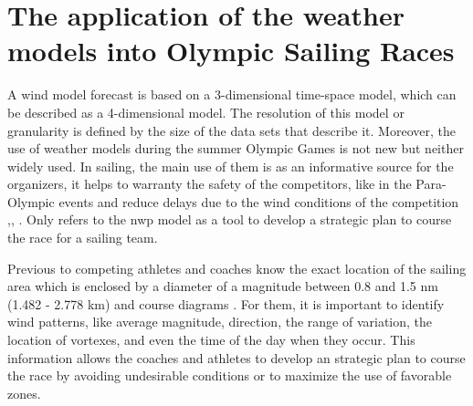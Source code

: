 



\section{The application of the weather models into Olympic Sailing Races}

A wind model forecast is based on a 3-dimensional time-space model, which can be described as a 4-dimensional model. The resolution of this model or granularity is defined by the size of the data sets that describe it. Moreover, the use of weather models during the summer Olympic Games is not new but neither widely used. In sailing, the main use of them is as an informative source for the organizers, it helps to warranty the safety of the competitors, like in the Para-Olympic events and reduce delays due to the wind conditions of the competition  \cite{spark2004wind},\cite{sheng2009structure}, \cite{golding2014forecasting}. Only \cite{giannaros2018ultrahigh} %
refers to the \acrshort{nwp} model as a tool to develop a strategic plan to course the race for a sailing team. \par 

Previous to competing athletes and coaches know the exact location of the sailing area which is enclosed by a diameter of a magnitude between 0.8 and 1.5 nm (1.482 - 2.778 km) and course diagrams \cite{SailRaceRio}. For them, it is important to identify wind patterns, like average magnitude, direction, the range of variation, the location of vortexes, and even the time of the day when they occur. This information allows the coaches and athletes to develop an strategic plan to course the race by avoiding undesirable conditions or to maximize the use of favorable zones.\par

